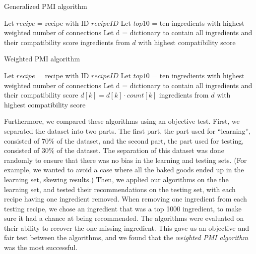 \documentclass{acm_proc_article-sp}
\begin{document}
  \begin{algorithm}
   \caption{Generalized PMI algorithm}
    \begin{algorithmic}
       \State Let $recipe$ = recipe with ID $recipeID$
        \State Let $top10$ = ten ingredients with highest weighted number of connections
        \State Let d = dictionary to contain all ingredients and their compatibility score
              \EndFor
        \EndFor
         ingredients from $d$ with highest compatibility score
       \EndFunction

\end{algorithmic}
\end{algorithm}

  \begin{algorithm}
   \caption{Weighted PMI algorithm}
    \begin{algorithmic}
      	\State Let $recipe$ = recipe with ID $recipeID$
        \State Let $top10$ = ten ingredients with highest weighted number of connections
        \State Let d = dictionary to contain all ingredients and their compatibility score
        		\EndFor
        	\EndIf
        \EndFor
        	$d[k] = d[k] \cdot count[k]$
        \EndFor
         ingredients from $d$ with highest compatibility score
       \EndFunction

\end{algorithmic}
\end{algorithm}


Furthermore, we compared these algorithms using an objective test. First, we separated the dataset into two parts. The first part, the part used for ``learning'', consisted of 70\% of the dataset, and the second part, the part used for testing, consisted of 30\% of the dataset. The separation of this dataset was done randomly to ensure that there was no bias in the learning and testing sets. (For example, we wanted to avoid a case where all the baked goods ended up in the learning set, skewing results.) Then, we applied our algorithms on the the learning set, and tested their recommendations on the testing set, with each recipe having one ingredient removed. When removing one ingredient from each testing recipe, we chose an ingredient that was a top 1000 ingredient, to make sure it had a chance at being recommended. The algorithms were evaluated on their ability to recover the one missing ingredient. This gave us an objective and fair test between the algorithms, and we found that the \textit{weighted PMI algorithm} was the most successful. 
\end{document}
